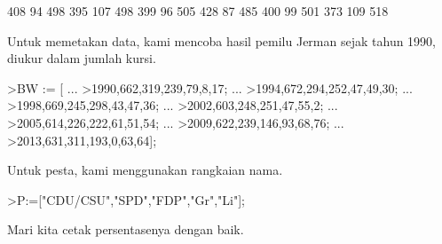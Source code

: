 \documentclass[a4paper,10pt]{article}
\begin{document}
\begin{eulernotebook}
\begin{eulercomment}
\begin{eulercomment}
\begin{euleroutput}
            408            94           498 
            395           107           498 
            399            96           505 
            428            87           485 
            400            99           501 
            373           109           518 
\end{euleroutput}
\begin{eulercomment}
Untuk memetakan data, kami mencoba hasil pemilu Jerman sejak tahun
1990, diukur dalam jumlah kursi.
\end{eulercomment}
\begin{eulerprompt}
>BW := [ ...
>1990,662,319,239,79,8,17; ...
>1994,672,294,252,47,49,30; ...
>1998,669,245,298,43,47,36; ...
>2002,603,248,251,47,55,2; ...
>2005,614,226,222,61,51,54; ...
>2009,622,239,146,93,68,76; ...
>2013,631,311,193,0,63,64];
\end{eulerprompt}
\begin{eulercomment}
Untuk pesta, kami menggunakan rangkaian nama.
\end{eulercomment}
\begin{eulerprompt}
>P:=["CDU/CSU","SPD","FDP","Gr","Li"];
\end{eulerprompt}
\begin{eulercomment}
Mari kita cetak persentasenya dengan baik.


\end{eulercomment}
\end{eulercomment}
\end{eulercomment}
\end{eulernotebook}
\end{document}
